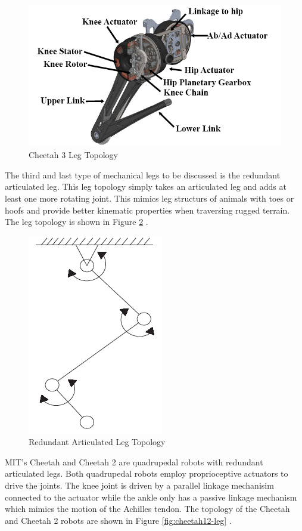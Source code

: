 \documentclass[english]{upeeei}
\begin{document}
\begin{figure}[H]
\begin{centering}
\includegraphics[width=0.7\columnwidth]{images/cheetah_3}
\par\end{centering}
\caption{Cheetah 3 Leg Topology\label{fig:cheetah-3-leg}}
\end{figure}

The third and last type of mechanical legs to be discussed is the redundant articulated leg. This leg topology simply takes an articulated leg and adds at least one more rotating joint. This mimics leg structurs of animals with toes or hoofs and provide better kinematic properties when traversing rugged terrain. The leg topology is shown in Figure \ref{fig:redundant-articulated-leg} \cite{quadrobotlegs}.

\begin{figure}[H]
\begin{centering}
\includegraphics[width=0.3\columnwidth]{images/redundant_articulated_leg}
\par\end{centering}
\caption{Redundant Articulated Leg Topology\label{fig:redundant-articulated-leg}}
\end{figure}

MIT's Cheetah and Cheetah 2 are quadrupedal robots with redundant articulated legs. Both quadrupedal robots employ proprioceptive actuators to drive the joints. The knee joint is driven by a parallel linkage mechanisim connected to the actuator while the ankle only has a passive linkage mechanism which mimics the motion of the Achilles tendon. The topology of the Cheetah and Cheetah 2 robots are shown in Figure \ref{fig:cheetah12-leg} \cite{quadrobotlegs, cheetah}.
\end{document}
